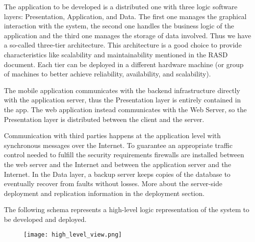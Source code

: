 The application to be developed is a distributed one with three logic software layers: Presentation, Application, and Data. The first one manages the graphical interaction with the system, the second one handles the business logic of the application and the third one manages the storage of data involved. Thus we have a so-called three-tier architecture. This architecture is a good choice to provide characteristics like scalability and maintainability mentioned in the RASD document. Each tier can be deployed in a different hardware machine (or group of machines to better achieve reliability, availability, and scalability).

The mobile application communicates with the backend infrastructure directly with the application server, thus the Presentation layer is entirely contained in the app. The web application instead communicates with the Web Server, so the Presentation layer is distributed between the client and the server. 

Communication with third parties happens at the application level with synchronous messages over the Internet. To guarantee an appropriate traffic control needed to fulfill the security requirements firewalls are installed between the web server and the Internet and between the application server and the Internet. In the Data layer, a backup server keeps copies of the database to eventually recover from faults without losses. More about the server-side deployment and replication information in the deployment section.

The following schema represents a high-level logic representation of the system to be developed and deployed.

\begin{figure}[H]
    \centering
    \texttt{[image: high\_level\_view.png]}
\end{figure}